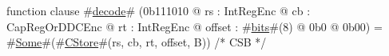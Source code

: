 function clause #\hyperref[zdecode]{decode}# (0b111010 @ rs : IntRegEnc @ cb : CapRegOrDDCEnc @ rt : IntRegEnc @ offset : #\hyperref[zbits]{bits}#(8) @ 0b0 @ 0b00) = #\hyperref[zSome]{Some}#(#\hyperref[zCStore]{CStore}#(rs, cb, rt, offset, B)) /* CSB */
